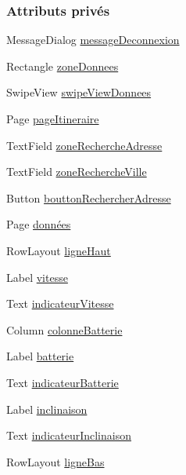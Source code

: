\subsubsection*{Attributs privés}
\begin{DoxyCompactItemize}
\item 
Message\+Dialog \hyperlink{class_page_carte_a568c9ee2a559b645ee3914ea36d19156}{message\+Deconnexion}
\item 
Rectangle \hyperlink{class_page_carte_a7e177e62466f97f757bcde0b45d0f461}{zone\+Donnees}
\item 
Swipe\+View \hyperlink{class_page_carte_ae741a4d5edd58f96788fa0e108e69cd4}{swipe\+View\+Donnees}
\item 
Page \hyperlink{class_page_carte_afad501d1f18a3665dfc6756f24a634e2}{page\+Itineraire}
\item 
Text\+Field \hyperlink{class_page_carte_a01dbcc8cc00107fb4ef3bc617540ee08}{zone\+Recherche\+Adresse}
\item 
Text\+Field \hyperlink{class_page_carte_ace51a569f45a195e0dc2e3bcc5f4f455}{zone\+Recherche\+Ville}
\item 
Button \hyperlink{class_page_carte_a11a85cfcce643c839e4b5d0be82841dc}{boutton\+Rechercher\+Adresse}
\item 
Page \hyperlink{class_page_carte_a056a17cfc7555356e2c1be58ad696a8c}{données}
\item 
Row\+Layout \hyperlink{class_page_carte_a4bbd7bd1bcbf52d6b1a02e6b7f1f787c}{ligne\+Haut}
\item 
Label \hyperlink{class_page_carte_ac6738468ea4cd409417060a8818603fb}{vitesse}
\item 
Text \hyperlink{class_page_carte_ab1e75b382dac00215c0e3ab4f33d3d66}{indicateur\+Vitesse}
\item 
Column \hyperlink{class_page_carte_a92dd7965b19b538f5a4b91fd1da11829}{colonne\+Batterie}
\item 
Label \hyperlink{class_page_carte_a91f6a01493a0831c19556991a757cf72}{batterie}
\item 
Text \hyperlink{class_page_carte_aa0bc82b7aa8ff7488ab3689b4a5c743d}{indicateur\+Batterie}
\item 
Label \hyperlink{class_page_carte_aaefd6baa99ea0d8b545cc85bee0cff49}{inclinaison}
\item 
Text \hyperlink{class_page_carte_a836b08dfd760281849e6d512e270e64e}{indicateur\+Inclinaison}
\item 
Row\+Layout \hyperlink{class_page_carte_a1d1f4e766052166c348f1b5fae56a474}{ligne\+Bas}
\item 

\end{DoxyCompactItemize}
